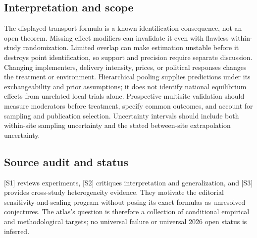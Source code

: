 \documentclass[11pt,a4paper]{article}
\begin{document}
\subsection*{Interpretation and scope}
The displayed transport formula is a known identification consequence, not an open theorem. Missing effect modifiers can invalidate it even with flawless within-study randomization. Limited overlap can make estimation unstable before it destroys point identification, so support and precision require separate discussion. Changing implementers, delivery intensity, prices, or political responses changes the treatment or environment. Hierarchical pooling supplies predictions under its exchangeability and prior assumptions; it does not identify national equilibrium effects from unrelated local trials alone. Prospective multisite validation should measure moderators before treatment, specify common outcomes, and account for sampling and publication selection. Uncertainty intervals should include both within-site sampling uncertainty and the stated between-site extrapolation uncertainty.
\subsection*{Source audit and status}
[S1] reviews experiments, [S2] critiques interpretation and generalization, and [S3] provides cross-study heterogeneity evidence. They motivate the editorial sensitivity-and-scaling program without posing its exact formulas as unresolved conjectures. The atlas's question is therefore a collection of conditional empirical and methodological targets; no universal failure or universal 2026 open status is inferred.
\end{document}

